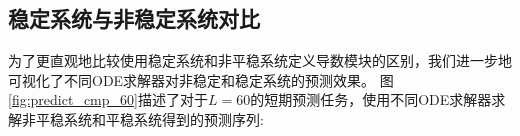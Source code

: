




\subsection{稳定系统与非稳定系统对比}

为了更直观地比较使用稳定系统和非平稳系统定义导数模块的区别，我们进一步地可视化了不同ODE求解器对非稳定和稳定系统的预测效果。
图\ref{fig:predict_cmp_60}描述了对于$L=60$的短期预测任务，使用不同ODE求解器求解非平稳系统和平稳系统得到的预测序列:

